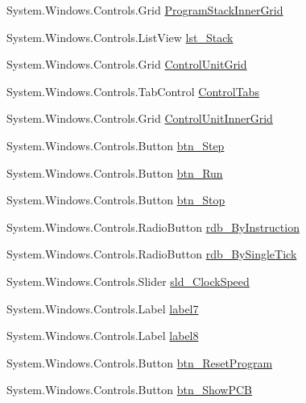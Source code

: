\begin{DoxyCompactItemize}
System.\+Windows.\+Controls.\+Grid \hyperlink{class_c_p_u___o_s___simulator_1_1_main_window_a8c373866c86f6be0e7ef487a5ccb8c3c}{Program\+Stack\+Inner\+Grid}
\item 
System.\+Windows.\+Controls.\+List\+View \hyperlink{class_c_p_u___o_s___simulator_1_1_main_window_a8453db331c7cc1e7c1e711a06b2ec30c}{lst\+\_\+\+Stack}
\item 
System.\+Windows.\+Controls.\+Grid \hyperlink{class_c_p_u___o_s___simulator_1_1_main_window_af6e1d9a71f9501c02b62e8319ba11b5a}{Control\+Unit\+Grid}
\item 
System.\+Windows.\+Controls.\+Tab\+Control \hyperlink{class_c_p_u___o_s___simulator_1_1_main_window_acc893fc507d9ea08cc4a923bdc23091d}{Control\+Tabs}
\item 
System.\+Windows.\+Controls.\+Grid \hyperlink{class_c_p_u___o_s___simulator_1_1_main_window_a0bb4b4233380c349ee3bef69813a684b}{Control\+Unit\+Inner\+Grid}
\item 
System.\+Windows.\+Controls.\+Button \hyperlink{class_c_p_u___o_s___simulator_1_1_main_window_acd572aa9d278af703febb634fc1c34a3}{btn\+\_\+\+Step}
\item 
System.\+Windows.\+Controls.\+Button \hyperlink{class_c_p_u___o_s___simulator_1_1_main_window_ab3286e931d7154605876654bbf092840}{btn\+\_\+\+Run}
\item 
System.\+Windows.\+Controls.\+Button \hyperlink{class_c_p_u___o_s___simulator_1_1_main_window_a1b6b541d9765ca230f537d1d6b6c83aa}{btn\+\_\+\+Stop}
\item 
System.\+Windows.\+Controls.\+Radio\+Button \hyperlink{class_c_p_u___o_s___simulator_1_1_main_window_acba6218f7f716645443533815c6bd7a3}{rdb\+\_\+\+By\+Instruction}
\item 
System.\+Windows.\+Controls.\+Radio\+Button \hyperlink{class_c_p_u___o_s___simulator_1_1_main_window_ab40dcb618f5398ab67213476fe1b86ca}{rdb\+\_\+\+By\+Single\+Tick}
\item 
System.\+Windows.\+Controls.\+Slider \hyperlink{class_c_p_u___o_s___simulator_1_1_main_window_a39cd3af9bb0f8a3ccd06fdd44c9ed6a3}{sld\+\_\+\+Clock\+Speed}
\item 
System.\+Windows.\+Controls.\+Label \hyperlink{class_c_p_u___o_s___simulator_1_1_main_window_a38ed6363fd03954967bda7a099f6b07e}{label7}
\item 
System.\+Windows.\+Controls.\+Label \hyperlink{class_c_p_u___o_s___simulator_1_1_main_window_a216fc6a1692d8a8f8b80b08348c1dcd4}{label8}
\item 
System.\+Windows.\+Controls.\+Button \hyperlink{class_c_p_u___o_s___simulator_1_1_main_window_ada16565fc869dea1d54013009f5892b4}{btn\+\_\+\+Reset\+Program}
\item 
System.\+Windows.\+Controls.\+Button \hyperlink{class_c_p_u___o_s___simulator_1_1_main_window_a967a1b3dbde7ecb1d8091e5eababcc58}{btn\+\_\+\+Show\+P\+C\+B}
\end{DoxyCompactItemize}
